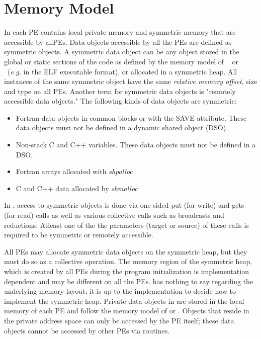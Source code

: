 \section{Memory Model}

In \openshmem{} each \ac{PE } contains local private memory and  symmetric memory that 
are accessible by all\ac{PE}s. Data objects accessible by all the \ac{PE}s are defined as symmetric objects.
A  symmetric data object can be any object stored in the global or static sections of the code as defined by the memory model of ~\Clang{} or ~\Fortran (\emph{e.g.} in the ELF executable format), 
or allocated in a symmetric heap.  All instances of the same symmetric object have the same \textit{relative memory offset}, size and type on all \ac{PE}s. 
Another term  for  symmetric data objects is "remotely accessible data objects."  The following kinds of data objects are symmetric:
\begin{itemize}
  \item Fortran data objects in common blocks or with the  SAVE  attribute. These data objects	must not be defined in a dynamic shared object (DSO).
  \item Non-stack C and C++ variables.   These  data	objects must  not  be defined in a DSO.
  \item Fortran arrays allocated with \textit{shpalloc} 
  \item C and C++ data allocated by \textit{shmalloc}
\end{itemize}       

In \openshmem, access to symmetric objects is done via  one-sided put (for write) and gets (for read) calls as well as various collective
calls such as broadcasts and reductions.  Atleast one of the the parameters (target or source) of these calls is required to be symmetric or remotely accessible. 

All \ac{PE}s may allocate symmetric data objects on the symmetric heap, but they must do so as a collective operation. 
The memory region of the symmetric heap, which is created by all \ac{PE}s during the program initialization is implementation dependent and 
may be different on all the \ac{PE}s. \openshmem has nothing
to say regarding the underlying memory layout; it is up to the implementation
to decide how to implement the symmetric heap. Private data objects in \openshmem are stored in the local memory of each \ac{PE} 
and follow the memory model of \Clang{} or \Fortran{}. Objects that reside in the private address space can only be accessed by the PE itself; these data objects
cannot be accessed by other PEs via \openshmem{} routines. 



%

